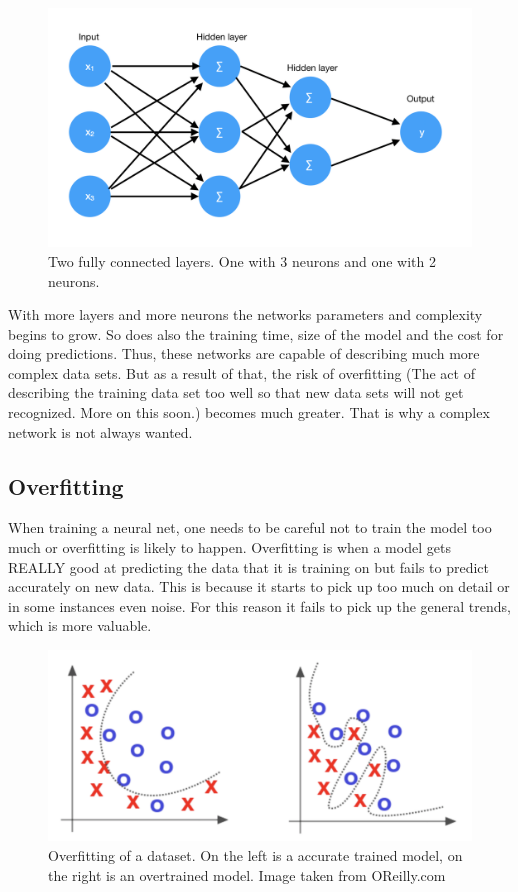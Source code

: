 \begin{figure}[hbtp]
\begin{center}
\includegraphics[width = 1.0\textwidth]{./Images/fully_connected.jpg} 
\caption{Two fully connected layers. One with 3 neurons and one with 2 neurons.}
\end{center}
\end{figure}

With more layers and more neurons the networks parameters and complexity begins to grow. So does also the training time, size of the model and the cost for doing predictions. Thus, these networks are capable of describing much more complex data sets. But as a result of that, the risk of overfitting (The act of describing the training data set too well so that new data sets will not get recognized. More on this soon.) becomes much greater. That is why a complex network is not always wanted.

\subsection{Overfitting}
When training a neural net, one needs to be careful not to train the model too much or overfitting is likely to happen. Overfitting is when a model gets REALLY good at predicting the data that it is training on but fails to predict accurately on new data. This is because it starts to pick up too much on detail or in some instances even noise. For this reason it fails to pick up the general trends, which is more valuable. 

\begin{figure}[hbtp]
\begin{center}
\includegraphics[width = 1.0\textwidth]{./Images/overfitting.jpg} 
\caption{Overfitting of a dataset. On the left is a accurate trained model, on the right is an overtrained model. Image taken from OReilly.com}
\end{center}
\end{figure}

